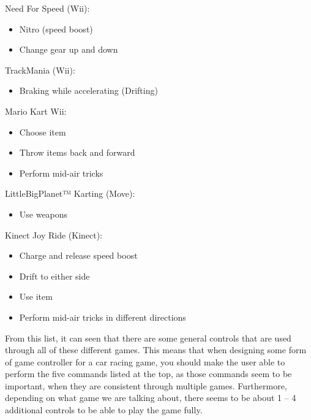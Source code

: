 Need For Speed (Wii):
\begin{itemize}
\item Nitro (speed boost)
\item Change gear up and down
\end{itemize}

TrackMania (Wii):
\begin{itemize}
\item Braking while accelerating (Drifting)
\end{itemize}

Mario Kart Wii:
\begin{itemize}
\item Choose item
\item Throw items back and forward
\item Perform mid-air tricks
\end{itemize}

LittleBigPlanet™ Karting (Move):
\begin{itemize}
\item Use weapons
\end{itemize}

Kinect Joy Ride (Kinect):
\begin{itemize}
\item Charge and release speed boost
\item Drift to either side
\item Use item
\item Perform mid-air tricks in different directions
\end{itemize}

From this list, it can seen that there are some general controls that are used through all of these different games. This means that when designing some form of game controller for a car racing game, you should make the user able to perform the five commands listed at the top, as those commands seem to be important, when they are consistent through multiple games. Furthermore, depending on what game we are talking about, there seems to be about 1 – 4 additional controls to be able to play the game fully.

